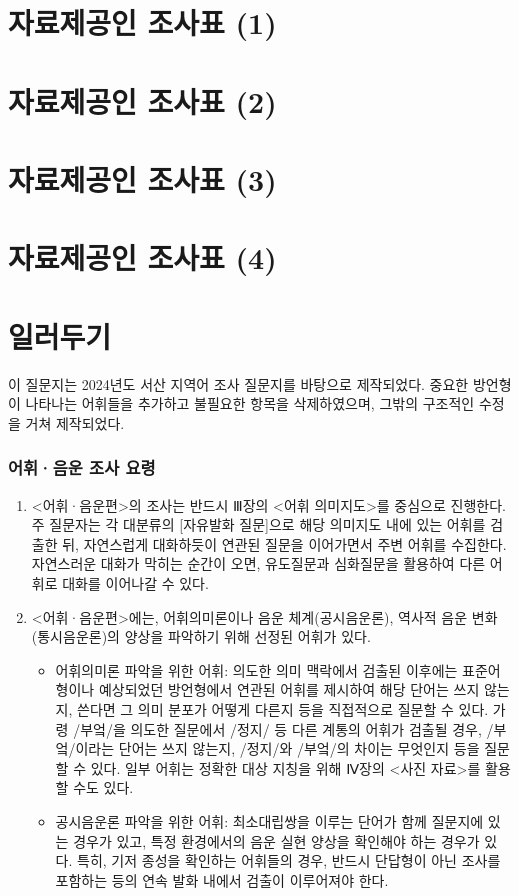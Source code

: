 \documentclass{snu-fl-questionnaire}
\begin{document}
\chapter{자료제공인 조사표 (1)}
\Consultant

\chapter{자료제공인 조사표 (2)}
\Consultant

\chapter{자료제공인 조사표 (3)}
\Consultant

\chapter{자료제공인 조사표 (4)}
\Consultant

\chapter{일러두기}

이 질문지는 2024년도 서산 지역어 조사 질문지를 바탕으로 제작되었다.
중요한 방언형이 나타나는 어휘들을 추가하고 불필요한 항목을 삭제하였으며, 그밖의 구조적인 수정을 거쳐 제작되었다. 

\subsection{어휘·음운 조사 요령}
\begin{enumerate}[noitemsep]
  \item <어휘·음운편>의 조사는 반드시 Ⅲ장의 <어휘 의미지도>를 중심으로 진행한다. 주 질문자는 각 대분류의 [자유발화 질문]으로 해당 의미지도 내에 있는 어휘를 검출한 뒤, 자연스럽게 대화하듯이 연관된 질문을 이어가면서 주변 어휘를 수집한다. 자연스러운 대화가 막히는 순간이 오면, 유도질문과 심화질문을 활용하여 다른 어휘로 대화를 이어나갈 수 있다.
  \item <어휘·음운편>에는, 어휘의미론이나 음운 체계(공시음운론), 역사적 음운 변화(통시음운론)의 양상을 파악하기 위해 선정된 어휘가 있다.
  \begin{itemize}[noitemsep]
    \item 어휘의미론 파악을 위한 어휘: 의도한 의미 맥락에서 검출된 이후에는 표준어형이나 예상되었던 방언형에서 연관된 어휘를 제시하여 해당 단어는 쓰지 않는지, 쓴다면 그 의미 분포가 어떻게 다른지 등을 직접적으로 질문할 수 있다. 가령 /부엌/을 의도한 질문에서 /정지/ 등 다른 계통의 어휘가 검출될 경우, /부엌/이라는 단어는 쓰지 않는지, /정지/와 /부엌/의 차이는 무엇인지 등을 질문할 수 있다. 일부 어휘는 정확한 대상 지칭을 위해 Ⅳ장의 <사진 자료>를 활용할 수도 있다.
    \item 공시음운론 파악을 위한 어휘: 최소대립쌍을 이루는 단어가 함께 질문지에 있는 경우가 있고, 특정 환경에서의 음운 실현 양상을 확인해야 하는 경우가 있다. 특히, 기저 종성을 확인하는 어휘들의 경우, 반드시 단답형이 아닌 조사를 포함하는 등의 연속 발화 내에서 검출이 이루어져야 한다.
  \end{itemize}
\end{enumerate}
\end{document}
